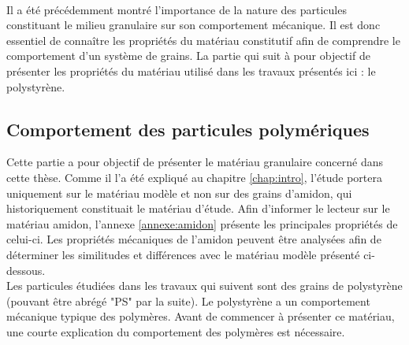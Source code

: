 		\paragraph{}
			Il a été précédemment montré l'importance de la nature des particules constituant le milieu granulaire sur son comportement mécanique. Il est donc essentiel de connaître les propriétés du matériau constitutif afin de comprendre le comportement d'un système de grains. La partie qui suit à pour objectif de présenter les propriétés du matériau utilisé dans les travaux présentés ici : le polystyrène.
	\subsection{Comportement des particules polymériques}
		Cette partie a pour objectif de présenter le matériau granulaire concerné dans cette thèse. Comme il l'a été expliqué au chapitre \ref{chap:intro}, l'étude portera uniquement sur le matériau modèle et non sur des grains d'amidon, qui historiquement constituait le matériau d'étude. Afin d'informer le lecteur sur le matériau amidon, l'annexe \ref{annexe:amidon} présente les principales propriétés de celui-ci. Les propriétés mécaniques de l'amidon peuvent être analysées afin de déterminer les similitudes et différences avec le matériau modèle présenté ci-dessous.
		\\Les particules étudiées dans les travaux qui suivent sont des grains de polystyrène (pouvant être abrégé "PS" par la suite). Le polystyrène a un comportement mécanique typique des polymères. Avant de commencer à présenter ce matériau, une courte explication du comportement des polymères est nécessaire.

